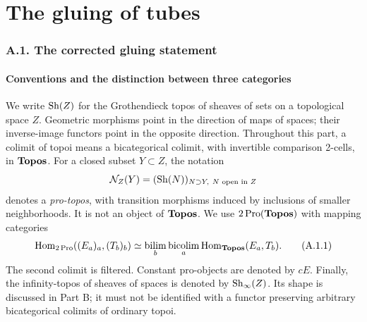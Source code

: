 \part{The gluing of tubes}
\section{A.1. The corrected gluing statement}
\subsection{Conventions and the distinction between three categories}
We write $\operatorname{Sh}(Z)$ for the Grothendieck topos of sheaves of sets on a
topological space $Z$. Geometric morphisms point in the direction of maps of
spaces; their inverse-image functors point in the opposite direction.
Throughout this part, a colimit of topoi means a bicategorical colimit,
with invertible comparison 2-cells, in $\mathbf{Topos}$.
For a closed subset $Y\subset Z$, the notation
\[
 \mathcal N_Z(Y)=(\operatorname{Sh}(N))_{N\supset Y,\ N\text{ open in }Z}
\]
denotes a \emph{pro-topos}, with transition morphisms induced by inclusions
of smaller neighborhoods. It is not an object of $\mathbf{Topos}$. We use
$2\operatorname{Pro}(\mathbf{Topos})$ with mapping categories
\[
 \operatorname{Hom}_{2\operatorname{Pro}}( (E_a)_a,(T_b)_b)
 \simeq \mathop{\mathrm{bilim}}_b
       \mathop{\mathrm{bicolim}}_a\operatorname{Hom}_{\mathbf{Topos}}(E_a,T_b).
\tag{A.1.1}\label{eq:prohom}
\]
The second colimit is filtered. Constant pro-objects are denoted by $cE$.
Finally, the infinity-topos of sheaves of spaces is denoted by
$\operatorname{Sh}_\infty(Z)$. Its shape is discussed in Part B; it must not be identified
with a functor preserving arbitrary bicategorical colimits of ordinary topoi.

